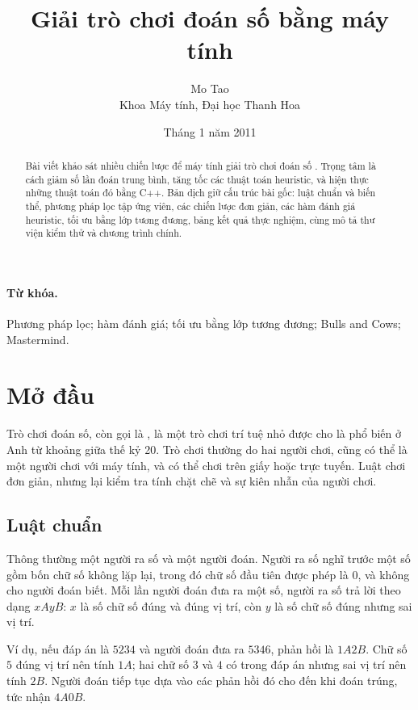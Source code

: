 \documentclass[11pt]{article}
\title{Giải trò chơi đoán số bằng máy tính}
\author{Mo Tao\\Khoa Máy tính, Đại học Thanh Hoa}
\date{Tháng 1 năm 2011}
\newcommand{\AB}[2]{#1A#2B}
\begin{document}
\maketitle


\begin{abstract}
Bài viết khảo sát nhiều chiến lược để máy tính giải trò chơi đoán số
. Trọng tâm là cách giảm số lần đoán trung bình, tăng tốc
các thuật toán heuristic, và hiện thực những thuật toán đó bằng C++. Bản dịch
giữ cấu trúc bài gốc: luật chuẩn và biến thể, phương pháp lọc tập ứng viên,
các chiến lược đơn giản, các hàm đánh giá heuristic, tối ưu bằng lớp tương
đương, bảng kết quả thực nghiệm, cùng mô tả thư viện kiểm thử và chương trình
chính.
\end{abstract}

\paragraph{Từ khóa.}
Phương pháp lọc; hàm đánh giá; tối ưu bằng lớp tương đương; Bulls and Cows;
Mastermind.

\tableofcontents

\section{Mở đầu}

Trò chơi đoán số, còn gọi là , là một trò chơi trí tuệ
nhỏ được cho là phổ biến ở Anh từ khoảng giữa thế kỷ 20. Trò chơi thường do
hai người chơi, cũng có thể là một người chơi với máy tính, và có thể chơi
trên giấy hoặc trực tuyến. Luật chơi đơn giản, nhưng lại kiểm tra tính chặt
chẽ và sự kiên nhẫn của người chơi.

\subsection{Luật chuẩn}

Thông thường một người ra số và một người đoán. Người ra số nghĩ trước một số
gồm bốn chữ số không lặp lại, trong đó chữ số đầu tiên được phép là \(0\), và
không cho người đoán biết. Mỗi lần người đoán đưa ra một số, người ra số trả
lời theo dạng \(xAyB\): \(x\) là số chữ số đúng và đúng vị trí, còn \(y\) là
số chữ số đúng nhưng sai vị trí.

Ví dụ, nếu đáp án là \(5234\) và người đoán đưa ra \(5346\), phản hồi là
\(\AB{1}{2}\). Chữ số \(5\) đúng vị trí nên tính \(1A\); hai chữ số \(3\) và
\(4\) có trong đáp án nhưng sai vị trí nên tính \(2B\). Người đoán tiếp tục
dựa vào các phản hồi đó cho đến khi đoán trúng, tức nhận \(\AB{4}{0}\).
\end{document}

